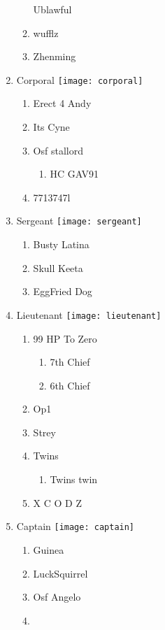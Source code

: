 \documentclass{article}
\begin{document}
\begin{enumerate}[I]
\begin{enumerate}[I]
	Ublawful
      \item
	wufflz
      \item
	Zhenming
    \end{enumerate}
  \item
    Corporal \texttt{[image: corporal]}
    \begin{enumerate}[I]
      \item
	Erect 4 Andy
      \item
	Its Cyne
      \item
	Osf stallord
	\begin{enumerate}[I]
	  \item
	    HC GAV91
	\end{enumerate}
      \item
	7713747l
    \end{enumerate}
  \item
    Sergeant \texttt{[image: sergeant]}
    \begin{enumerate}[I]
      \item
	Busty Latina
      \item
	Skull Keeta
      \item
	EggFried Dog
    \end{enumerate}
  \item
    Lieutenant \texttt{[image: lieutenant]}
    \begin{enumerate}[I]
      \item 
	99 HP To Zero
	\begin{enumerate}[I]
	  \item
	    7th Chief
	  \item
	    6th Chief
	\end{enumerate}
      \item
	Op1
      \item
	Strey
      \item
	Twins
	  \begin{enumerate}[I]
	    \item
	      Twins twin
	  \end{enumerate}
      \item
	X C O D Z
    \end{enumerate}
  \item
    Captain \texttt{[image: captain]}
    \begin{enumerate}[I]
      \item
	Guinea
      \item
	LuckSquirrel
      \item
	Osf Angelo
      \item

\end{enumerate}
\end{enumerate}
\end{document}
